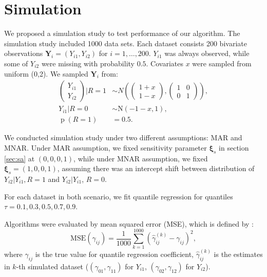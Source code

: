 \documentclass[12pt]{article}
\DeclareMathOperator{\pr}{p}
\begin{document}
\section{Simulation}
\label{sec:simulation}
We proposed a simulation study to test performance of our
algorithm. The simulation study included 1000 data sets. Each dataset
consists 200 bivariate observations $\bm Y_i = (Y_{i1}, Y_{i2})$ for
$i = 1, \ldots, 200$. $Y_{i1}$ was always observed, while some of
$Y_{i2}$ were missing with probability $0.5$. Covariates $x$ were
sampled from uniform (0,2). We sampled $\bm Y_i$ from:
\begin{align*}
  \begin{pmatrix}
    Y_{i1}\\
    Y_{i2}
  \end{pmatrix}
  \Big |R = 1 & \sim N \left(
    \begin{pmatrix}
      1 + x\\
      1 - x
    \end{pmatrix},
    \begin{pmatrix}
      1& 0 \\
      0 & 1
    \end{pmatrix} \right), \\
  Y_{i1} | R = 0 & \sim \textrm{N}(-1-x, 1) , \\
  \pr (R = 1) & = 0.5.
\end{align*}

We conducted simulation study under two different assumptions: MAR and
MNAR. Under MAR assumption, we fixed sensitivity parameter $\bm \xi_s$
in section \ref{sec:sa} at $(0, 0, 0, 1)$, while under MNAR
assumption, we fixed $\bm \xi_s = (1, 0, 0, 1)$, assuming there was an
intercept shift between distribution of $Y_{i2}|Y_{i1}, R = 1$ and
$Y_{i2}|Y_{i1}$, $R = 0$.

For each dataset in both scenario, we fit quantile regression for
quantiles $\tau = 0.1, 0.3, 0.5, 0.7, 0.9$.

Algorithms were evaluated by mean squared error (MSE), which is
defined by :
\begin{equation}
  \label{eq:eval}
  \text{MSE} (\gamma_{ij}) = \frac{1}{1000} \sum_{k = 1}^{1000} \left( \hat{\gamma}_{ij}^{(k)}  - \gamma_{ij}\right)^2,
\end{equation}
where $\gamma_{ij}$ is the true value for quantile regression
coefficient, $\hat{\gamma}_{ij}^{(k)}$ is the estimates in $k$-th
simulated dataset ($(\gamma_{01}, \gamma_{11})$ for $Y_{i1}$,
$(\gamma_{02}, \gamma_{12})$ for $Y_{i2}$).
\end{document}
